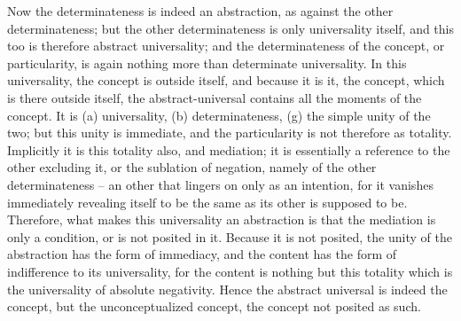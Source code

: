 Now the determinateness is indeed an abstraction, as against the other
determinateness; but the other determinateness is only universality itself,
and this too is therefore abstract universality; and the determinateness
of the concept, or particularity, is again nothing more than determinate
universality. In this universality, the concept is outside itself, and because it is
it, the concept, which is there outside itself, the abstract-universal contains all
the moments of the concept. It is (a) universality, (b) determinateness, (g)
the simple unity of the two; but this unity is immediate, and the particularity
is not therefore as totality. Implicitly it is this totality also, and mediation;
it is essentially a reference to the other excluding it, or the sublation of
negation, namely of the other determinateness – an other that lingers on
only as an intention, for it vanishes immediately revealing itself to be the
same as its other is supposed to be. Therefore, what makes this universality
an abstraction is that the mediation is only a condition, or is not posited
in it. Because it is not posited, the unity of the abstraction has the form of
immediacy, and the content has the form of indifference to its universality,
for the content is nothing but this totality which is the universality of
absolute negativity. Hence the abstract universal is indeed the concept, but
the unconceptualized concept, the concept not posited as such.

